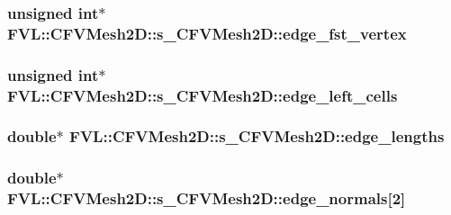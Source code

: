 \label{da/d6f/structFVL_1_1CFVMesh2D_1_1s__CFVMesh2D_ad9a605d4840c19468d8a4b15f8588cf2}
\hypertarget{structFVL_1_1CFVMesh2D_1_1s__CFVMesh2D_a1056b04882b7cee50a1abf8f670d0bd4}{
\subsubsection[{edge\_\-fst\_\-vertex}]{\setlength{\rightskip}{0pt plus 5cm}unsigned int$\ast$ {\bf FVL::CFVMesh2D::s\_\-CFVMesh2D::edge\_\-fst\_\-vertex}}}
\label{da/d6f/structFVL_1_1CFVMesh2D_1_1s__CFVMesh2D_a1056b04882b7cee50a1abf8f670d0bd4}
\hypertarget{structFVL_1_1CFVMesh2D_1_1s__CFVMesh2D_a8463782b95c009bc930bb652940a058d}{
\subsubsection[{edge\_\-left\_\-cells}]{\setlength{\rightskip}{0pt plus 5cm}unsigned int$\ast$ {\bf FVL::CFVMesh2D::s\_\-CFVMesh2D::edge\_\-left\_\-cells}}}
\label{da/d6f/structFVL_1_1CFVMesh2D_1_1s__CFVMesh2D_a8463782b95c009bc930bb652940a058d}
\hypertarget{structFVL_1_1CFVMesh2D_1_1s__CFVMesh2D_ada1058ae4bf4ec15205639f0f53b396c}{
\subsubsection[{edge\_\-lengths}]{\setlength{\rightskip}{0pt plus 5cm}double$\ast$ {\bf FVL::CFVMesh2D::s\_\-CFVMesh2D::edge\_\-lengths}}}
\label{da/d6f/structFVL_1_1CFVMesh2D_1_1s__CFVMesh2D_ada1058ae4bf4ec15205639f0f53b396c}
\hypertarget{structFVL_1_1CFVMesh2D_1_1s__CFVMesh2D_a40ae6a2aeddd8ae22b210c3c5551044f}{
\subsubsection[{edge\_\-normals}]{\setlength{\rightskip}{0pt plus 5cm}double$\ast$ {\bf FVL::CFVMesh2D::s\_\-CFVMesh2D::edge\_\-normals}\mbox{[}2\mbox{]}}}
